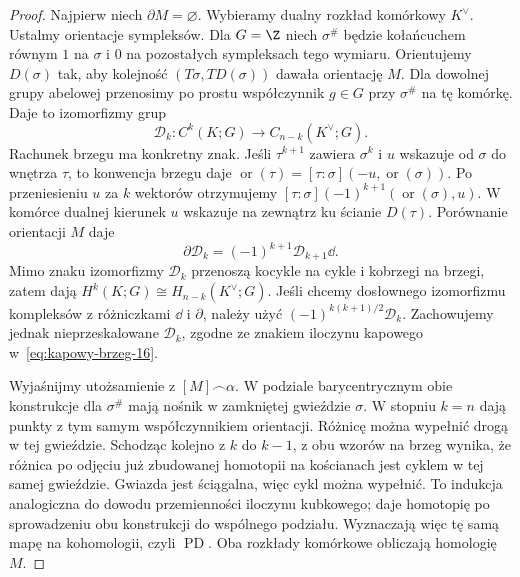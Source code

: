 \begin{proof}
Najpierw niech $\partial M=\varnothing$.
Wybieramy dualny rozkład komórkowy
$K^\vee$. Ustalmy orientacje sympleksów. Dla $G=\Z$ niech
$\sigma^\#$ będzie kołańcuchem równym $1$ na $\sigma$
i $0$ na pozostałych sympleksach tego wymiaru.
Orientujemy $D(\sigma)$ tak, aby kolejność
$(T\sigma,TD(\sigma))$ dawała orientację $M$.
Dla dowolnej grupy abelowej przenosimy po prostu
współczynnik $g\in G$ przy $\sigma^\#$ na tę komórkę.
Daje to izomorfizmy grup
\[
 \mathcal D_k:C^k(K;G)\longrightarrow C_{n-k}(K^\vee;G).
\]
Rachunek brzegu ma konkretny znak. Jeśli $\tau^{k+1}$
zawiera $\sigma^k$ i $u$ wskazuje od $\sigma$ do wnętrza
$\tau$, to konwencja brzegu daje
$\operatorname{or}(\tau)=[\tau:\sigma](-u,\operatorname{or}(\sigma))$.
Po przeniesieniu $u$ za $k$ wektorów otrzymujemy
$[\tau:\sigma](-1)^{k+1}(\operatorname{or}(\sigma),u)$.
W komórce dualnej kierunek $u$ wskazuje na zewnątrz
ku ścianie $D(\tau)$. Porównanie orientacji $M$ daje
\begin{equation}\label{eq:dualny-lancuch-16}
 \partial\mathcal D_k=(-1)^{k+1}\mathcal D_{k+1}\dd.
\end{equation}
Mimo znaku izomorfizmy $\mathcal D_k$ przenoszą
kocykle na cykle i kobrzegi na brzegi, zatem dają
$H^k(K;G)\cong H_{n-k}(K^\vee;G)$.
Jeśli chcemy dosłownego izomorfizmu kompleksów
z różniczkami $\dd$ i $\partial$, należy użyć
$(-1)^{k(k+1)/2}\mathcal D_k$. Zachowujemy jednak
nieprzeskalowane $\mathcal D_k$, zgodne ze znakiem
iloczynu kapowego w~\eqref{eq:kapowy-brzeg-16}.

Wyjaśnijmy utożsamienie z $[M]\frown\alpha$.
W podziale barycentrycznym obie konstrukcje dla
$\sigma^\#$ mają nośnik w zamkniętej gwieździe $\sigma$.
W stopniu $k=n$ dają punkty z tym samym współczynnikiem
orientacji. Różnicę można wypełnić drogą w tej gwieździe.
Schodząc kolejno z $k$ do $k-1$, z obu wzorów na brzeg
wynika, że różnica po odjęciu już zbudowanej homotopii
na kościanach jest cyklem w tej samej gwieździe.
Gwiazda jest ściągalna, więc cykl można wypełnić.
To indukcja analogiczna do dowodu przemienności
iloczynu kubkowego; daje homotopię po sprowadzeniu
obu konstrukcji do wspólnego podziału. Wyznaczają
więc tę samą mapę na kohomologii, czyli $\operatorname{PD}$.
Oba rozkłady komórkowe obliczają homologię $M$.


\end{proof}
